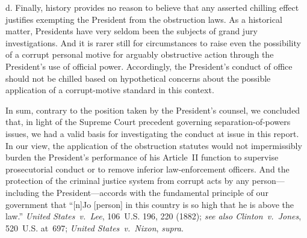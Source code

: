 d. Finally, history provides no reason to believe that any asserted chilling effect justifies exempting the President from the obstruction laws.
As a historical matter, Presidents have very seldom been the subjects of grand jury investigations.
And it is rarer still for circumstances to raise even the possibility of a corrupt personal motive for arguably obstructive action through the President's use of official power.
Accordingly, the President's conduct of office should not be chilled based on hypothetical concerns about the possible application of a corrupt-motive standard in this context.

\hr

In sum, contrary to the position taken by the President's counsel, we concluded that, in light of the Supreme Court precedent governing separation-of-powers issues, we had a valid basis for investigating the conduct at issue in this report.
In our view, the application of the obstruction statutes would not impermissibly burden the President's performance of his Article~II function to supervise prosecutorial conduct or to remove inferior law-enforcement officers.
And the protection of the criminal justice system from corrupt acts by any person---including the President---accords with the fundamental principle of our government that ``[n]Jo [person] in this country is so high that he is above the law.''
\textit{United States~v.\ Lee}, 106~U.S. 196, 220 (1882);
\textit{see also Clinton~v.\ Jones}, 520~U.S. at~697;
\textit{United States~v.\ Nixon}, \textit{supra}.
